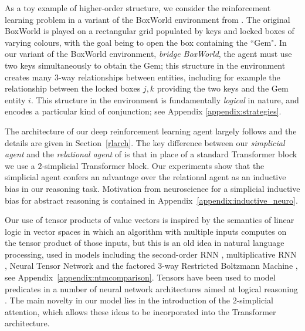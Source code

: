 \documentclass{article} %
\begin{document}

As a toy example of higher-order structure, we consider the reinforcement learning problem in a variant of the BoxWorld environment from \citep{zambaldi}. The original BoxWorld is played on a rectangular grid populated by keys and locked boxes of varying colours, with the goal being to open the box containing the ``Gem". In our variant of the BoxWorld environment, \emph{bridge BoxWorld}, the agent must use two keys simultaneously to obtain the Gem; this structure in the environment creates many $3$-way relationships between entities, including for example the relationship between the locked boxes $j,k$ providing the two keys and the Gem entity $i$. This structure in the environment is fundamentally \emph{logical} in nature, and encodes a particular kind of conjunction; see Appendix \ref{appendix:strategies}.

The architecture of our deep reinforcement learning agent largely follows \citep{zambaldi} and the details are given in Section~\ref{rlarch}.  The key difference between our \emph{simplicial agent} and the \emph{relational agent} of \citep{zambaldi} is that in place of a standard Transformer block we use a $2$-simplicial Transformer block.  Our experiments show that the simplicial agent confers an advantage over the relational agent as an inductive bias in our reasoning task.  Motivation from neuroscience for a simplicial inductive bias for abstract reasoning is contained in Appendix~\ref{appendix:inductive_neuro}.

Our use of tensor products of value vectors is inspired by the semantics of linear logic in vector spaces \citep{girard_llogic,mellies,cliftmurfet2,wallbridge} in which an algorithm with multiple inputs computes on the tensor product of those inputs, but this is an old idea in natural language processing, used in models including the second-order RNN \citep{highorderrec,pollack,firstvsecond,secondorder}, multiplicative RNN \citep{sutskever, irsoy}, Neural Tensor Network \citep{socher2013} and the factored $3$-way Restricted Boltzmann Machine \citep{ranzato}, see Appendix~\ref{appendix:ntmcomparison}.   Tensors have been used to model predicates in a number of neural network architectures aimed at logical reasoning \citep{serafini,neurallogicm}. The main novelty in our model lies in the introduction of the $2$-simplicial attention, which allows these ideas to be incorporated into the Transformer architecture.
\end{document}
